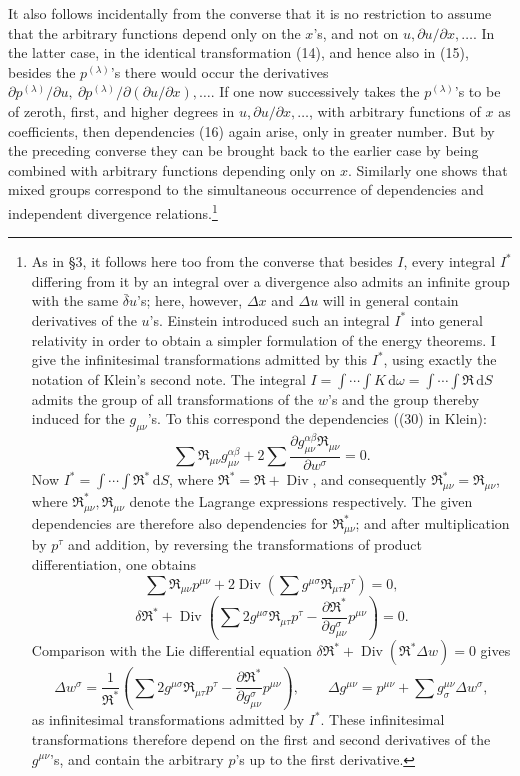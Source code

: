 \documentclass[11pt]{article}
\newcommand{\D}{\Delta}
\providecommand{\dd}{\mathrm d}
\providecommand{\Div}{\operatorname{Div}}
\providecommand{\bd}{\bar{\delta}}
\providecommand{\p}{\partial}
\begin{document}
It also follows incidentally from the converse that it is no restriction to assume that the arbitrary functions depend only on the \(x\)'s, and not on \(u,\p u/\p x,\ldots\). In the latter case, in the identical transformation (14), and hence also in (15), besides the \(p^{(\lambda)}\)'s there would occur the derivatives \(\p p^{(\lambda)}/\p u,\ \p p^{(\lambda)}/\p(\p u/\p x),\ldots\). If one now successively takes the \(p^{(\lambda)}\)'s to be of zeroth, first, and higher degrees in \(u,\p u/\p x,\ldots\), with arbitrary functions of \(x\) as coefficients, then dependencies (16) again arise, only in greater number. But by the preceding converse they can be brought back to the earlier case by being combined with arbitrary functions depending only on \(x\). Similarly one shows that mixed groups correspond to the simultaneous occurrence of dependencies and independent divergence relations.\footnote{As in \S{}3, it follows here too from the converse that besides \(I\), every integral \(I^*\) differing from it by an integral over a divergence also admits an infinite group with the same \(\bd u\)'s; here, however, \(\D x\) and \(\D u\) will in general contain derivatives of the \(u\)'s. Einstein introduced such an integral \(I^*\) into general relativity in order to obtain a simpler formulation of the energy theorems. I give the infinitesimal transformations admitted by this \(I^*\), using exactly the notation of Klein's second note. The integral \(I=\int\!\cdots\!\int K\,\dd\omega=\int\!\cdots\!\int \mathfrak{R}\,\dd S\) admits the group of all transformations of the \(w\)'s and the group thereby induced for the \(g_{\mu\nu}\)'s. To this correspond the dependencies ((30) in Klein):
\[
\sum \mathfrak{R}_{\mu\nu}g_{\mu\nu}^{\alpha\beta}
+2\sum\frac{\p g_{\mu\nu}^{\alpha\beta}\mathfrak{R}_{\mu\nu}}{\p w^\sigma}=0.
\]
Now \(I^*=\int\!\cdots\!\int \mathfrak{R}^*\,\dd S\), where \(\mathfrak{R}^*=\mathfrak{R}+\Div\), and consequently \(\mathfrak{R}_{\mu\nu}^*=\mathfrak{R}_{\mu\nu}\), where \(\mathfrak{R}_{\mu\nu}^*,\mathfrak{R}_{\mu\nu}\) denote the Lagrange expressions respectively. The given dependencies are therefore also dependencies for \(\mathfrak{R}_{\mu\nu}^*\); and after multiplication by \(p^\tau\) and addition, by reversing the transformations of product differentiation, one obtains
\[
\sum \mathfrak{R}_{\mu\nu}p^{\mu\nu}
+2\Div\!\left(\sum g^{\mu\sigma}\mathfrak{R}_{\mu\tau}p^\tau\right)=0,
\]
\[
\delta\mathfrak{R}^*+\Div\!\left(\sum 2g^{\mu\sigma}\mathfrak{R}_{\mu\tau}p^\tau
-\frac{\p\mathfrak{R}^*}{\p g_{\mu\nu}^{\sigma}}p^{\mu\nu}\right)=0.
\]
Comparison with the Lie differential equation
\(\delta\mathfrak{R}^*+\Div(\mathfrak{R}^*\D w)=0\) gives
\[
\D w^\sigma=\frac1{\mathfrak{R}^*}\left(\sum 2g^{\mu\sigma}\mathfrak{R}_{\mu\tau}p^\tau
-\frac{\p\mathfrak{R}^*}{\p g_{\mu\nu}^{\sigma}}p^{\mu\nu}\right),
\qquad
\D g^{\mu\nu}=p^{\mu\nu}+\sum g^{\mu\nu}_{\sigma}\D w^\sigma,
\]
as infinitesimal transformations admitted by \(I^*\). These infinitesimal transformations therefore depend on the first and second derivatives of the \(g^{\mu\nu}\)'s, and contain the arbitrary \(p\)'s up to the first derivative.}
\end{document}
